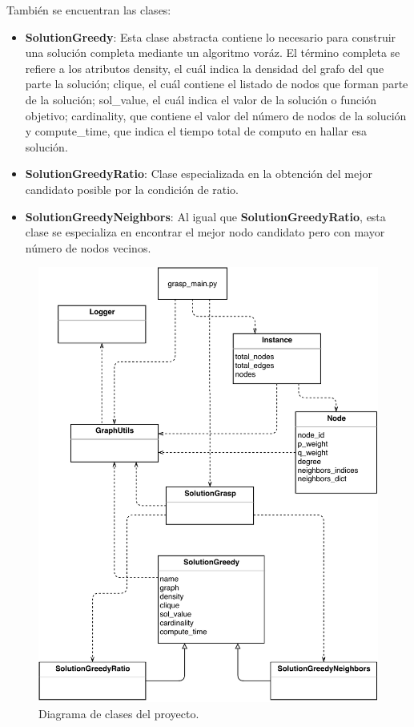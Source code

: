 También se encuentran las clases:
 \begin{itemize}
	\item \textbf{SolutionGreedy}: Esta clase abstracta contiene lo necesario para construir una solución completa mediante un algoritmo voráz. El término completa se refiere a los atributos density, el cuál indica la densidad del grafo del que parte la solución; clique, el cuál contiene el listado de nodos que forman parte de la solución; sol\_value, el cuál indica el valor de la solución o función objetivo; cardinality, que contiene el valor del número de nodos de la solución y compute\_time, que indica el tiempo total de computo en hallar esa solución.
	\item \textbf{SolutionGreedyRatio}: Clase especializada en la obtención del mejor candidato posible por la condición de ratio.
	\item \textbf{SolutionGreedyNeighbors}: Al igual que \textbf{SolutionGreedyRatio}, esta clase se especializa en encontrar el mejor nodo candidato pero con mayor número de nodos vecinos.
\end{itemize}


\begin{figure}[H]
	\centering
	\includegraphics{Figures/Diagrama-clases.pdf}
	\caption{Diagrama de clases del proyecto.}
	\label{fig:diagrama-clases}
\end{figure}

